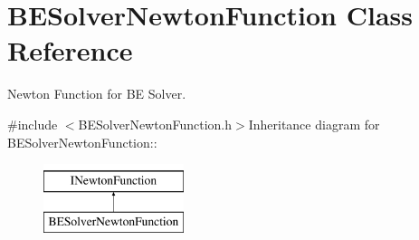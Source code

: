 \hypertarget{classBESolverNewtonFunction}{
\section{BESolverNewtonFunction Class Reference}
\label{classBESolverNewtonFunction}
}


Newton Function for BE Solver.  


{\ttfamily \#include $<$BESolverNewtonFunction.h$>$}Inheritance diagram for BESolverNewtonFunction::\begin{figure}[H]
\begin{center}
\leavevmode
\includegraphics[height=2cm]{classBESolverNewtonFunction}
\end{center}
\end{figure}
